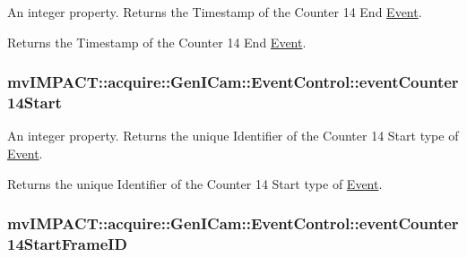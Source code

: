 An integer property. Returns the Timestamp of the Counter 14 End \hyperlink{classmv_i_m_p_a_c_t_1_1acquire_1_1_event}{Event}. 

Returns the Timestamp of the Counter 14 End \hyperlink{classmv_i_m_p_a_c_t_1_1acquire_1_1_event}{Event}. \hypertarget{classmv_i_m_p_a_c_t_1_1acquire_1_1_gen_i_cam_1_1_event_control_a033db2c7349b1366ff97789dd8c64aff}{
\subsubsection[{event\+Counter14\+Start}]{ mv\+I\+M\+P\+A\+C\+T\+::acquire\+::\+Gen\+I\+Cam\+::\+Event\+Control\+::event\+Counter14\+Start}}\label{classmv_i_m_p_a_c_t_1_1acquire_1_1_gen_i_cam_1_1_event_control_a033db2c7349b1366ff97789dd8c64aff}


An integer property. Returns the unique Identifier of the Counter 14 Start type of \hyperlink{classmv_i_m_p_a_c_t_1_1acquire_1_1_event}{Event}. 

Returns the unique Identifier of the Counter 14 Start type of \hyperlink{classmv_i_m_p_a_c_t_1_1acquire_1_1_event}{Event}. \hypertarget{classmv_i_m_p_a_c_t_1_1acquire_1_1_gen_i_cam_1_1_event_control_a435210f231fdbbdcf7d0eecc6fd6e061}{
\subsubsection[{event\+Counter14\+Start\+Frame\+I\+D}]{ mv\+I\+M\+P\+A\+C\+T\+::acquire\+::\+Gen\+I\+Cam\+::\+Event\+Control\+::event\+Counter14\+Start\+Frame\+I\+D}}\label{classmv_i_m_p_a_c_t_1_1acquire_1_1_gen_i_cam_1_1_event_control_a435210f231fdbbdcf7d0eecc6fd6e061}


